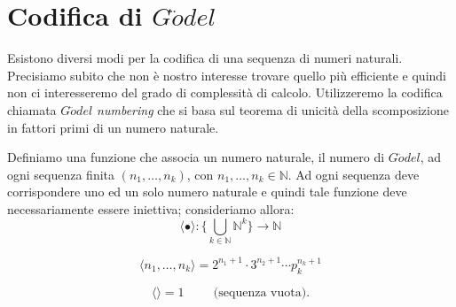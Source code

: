 \section{Codifica di $G\ddot{o}del$}
Esistono diversi modi per la codifica di una sequenza di numeri naturali. Precisiamo subito che non \`e nostro interesse trovare quello pi\`u efficiente e quindi non ci interesseremo del grado di complessit\`a di calcolo. Utilizzeremo la codifica chiamata \emph{$G\ddot{o}del$ numbering} che si basa sul teorema di unicit\`a della scomposizione in fattori primi di un numero naturale.

Definiamo una funzione che associa un numero naturale, il numero di $G\ddot{o}del$, ad ogni sequenza finita $(n_1,\ldots,n_{k})$, con $n_1,\ldots,n_{k}\in \mathbb {N}$. Ad ogni sequenza deve corrispondere uno ed un solo numero naturale e quindi tale funzione deve necessariamente essere iniettiva; consideriamo allora:
 \begin{displaymath}
\langle \bullet \rangle : \{\bigcup_{k\in\mathbb{N}} \mathbb{N}^k\} \rightarrow \mathbb{N}
\end{displaymath}

\begin{displaymath}
\langle n_1,\ldots,n_{k} \rangle = 2^{n_1+1} \cdot 3^{n_2+1}\cdots p_{k}^{n_{k}+1}
\end{displaymath}

\begin{displaymath}
\langle \rangle = 1\hspace{1cm}\text{(sequenza vuota).}
\end{displaymath}

